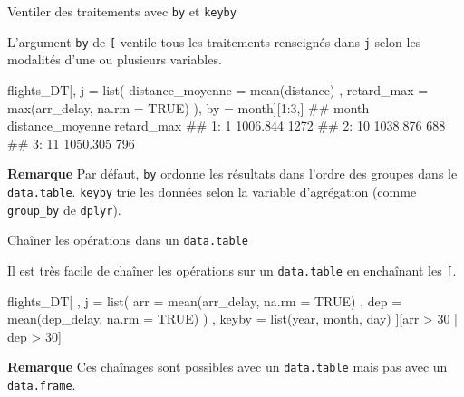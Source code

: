 \documentclass[12pt,handout,ignorenonframetext,]{beamer}
\newenvironment{Shaded}{}{}
\newcommand{\KeywordTok}[1]{\textcolor[rgb]{0.00,0.00,1.00}{{#1}}}
\newcommand{\DataTypeTok}[1]{{#1}}
\newcommand{\DecValTok}[1]{{#1}}
\newcommand{\StringTok}[1]{\textcolor[rgb]{0.00,0.50,0.50}{{#1}}}
\newcommand{\OtherTok}[1]{\textcolor[rgb]{1.00,0.25,0.00}{{#1}}}
\newcommand{\NormalTok}[1]{{#1}}
\renewenvironment{Shaded}{\begin{snugshade}}{\end{snugshade}}
\begin{document}
\begin{frame}[fragile]{Ventiler des traitements avec \texttt{by} et
\texttt{keyby}}

L'argument \texttt{by} de \texttt{{[}} ventile tous les traitements
renseignés dans \texttt{j} selon les modalités d'une ou plusieurs
variables.

\begin{Shaded}
\begin{Highlighting}[]
\NormalTok{flights_DT[, j =}\StringTok{ }\KeywordTok{list}\NormalTok{(}
  \DataTypeTok{distance_moyenne =} \KeywordTok{mean}\NormalTok{(distance)}
  \NormalTok{, }\DataTypeTok{retard_max =} \KeywordTok{max}\NormalTok{(arr_delay, }\DataTypeTok{na.rm =} \OtherTok{TRUE}\NormalTok{)}
\NormalTok{), by =}\StringTok{ }\NormalTok{month][}\DecValTok{1}\NormalTok{:}\DecValTok{3}\NormalTok{,]}
  \NormalTok{##    month distance_moyenne retard_max}
  \NormalTok{## 1:     1         1006.844       1272}
  \NormalTok{## 2:    10         1038.876        688}
  \NormalTok{## 3:    11         1050.305        796}
\end{Highlighting}
\end{Shaded}

\textbf{Remarque} Par défaut, \texttt{by} ordonne les résultats dans
l'ordre des groupes dans le \texttt{data.table}. \texttt{keyby} trie les
données selon la variable d'agrégation (comme \texttt{group\_by} de
\texttt{dplyr}).

\end{frame}

\begin{frame}[fragile]{Chaîner les opérations dans un
\texttt{data.table}}

Il est très facile de chaîner les opérations sur un \texttt{data.table}
en enchaînant les \texttt{{[}}.

\begin{Shaded}
\begin{Highlighting}[]
\NormalTok{flights_DT[}
  \NormalTok{, j =}\StringTok{ }\KeywordTok{list}\NormalTok{(}
    \DataTypeTok{arr =} \KeywordTok{mean}\NormalTok{(arr_delay, }\DataTypeTok{na.rm =} \OtherTok{TRUE}\NormalTok{)}
    \NormalTok{, }\DataTypeTok{dep =} \KeywordTok{mean}\NormalTok{(dep_delay, }\DataTypeTok{na.rm =} \OtherTok{TRUE}\NormalTok{)}
  \NormalTok{)}
  \NormalTok{, keyby =}\StringTok{ }\KeywordTok{list}\NormalTok{(year, month, day)}
\NormalTok{][arr >}\StringTok{ }\DecValTok{30} \NormalTok{|}\StringTok{ }\NormalTok{dep >}\StringTok{ }\DecValTok{30}\NormalTok{]}
\end{Highlighting}
\end{Shaded}

\textbf{Remarque} Ces chaînages sont possibles avec un
\texttt{data.table} mais pas avec un \texttt{data.frame}.

\end{frame}
\end{document}
